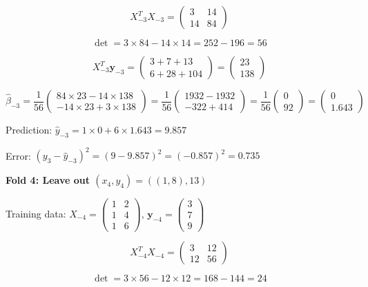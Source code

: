 \documentclass[12pt]{article}
\begin{document}
\begin{solution}
\[X_{-3}^TX_{-3} = \begin{pmatrix} 3 & 14 \\ 14 & 84 \end{pmatrix}\]

\[\det = 3 \times 84 - 14 \times 14 = 252 - 196 = 56\]

\[X_{-3}^T\mathbf{y}_{-3} = \begin{pmatrix} 3 + 7 + 13 \\ 6 + 28 + 104 \end{pmatrix} = \begin{pmatrix} 23 \\ 138 \end{pmatrix}\]

\[\hat{\beta}_{-3} = \frac{1}{56}\begin{pmatrix} 84 \times 23 - 14 \times 138 \\ -14 \times 23 + 3 \times 138 \end{pmatrix} = \frac{1}{56}\begin{pmatrix} 1932 - 1932 \\ -322 + 414 \end{pmatrix} = \frac{1}{56}\begin{pmatrix} 0 \\ 92 \end{pmatrix} = \begin{pmatrix} 0 \\ 1.643 \end{pmatrix}\]

Prediction: $\hat{y}_{-3} = 1 \times 0 + 6 \times 1.643 = 9.857$

Error: $(y_3 - \hat{y}_{-3})^2 = (9 - 9.857)^2 = (-0.857)^2 = 0.735$

\textbf{Fold 4: Leave out $(x_4, y_4) = ((1,8), 13)$}

Training data: $X_{-4} = \begin{pmatrix} 1 & 2 \\ 1 & 4 \\ 1 & 6 \end{pmatrix}$, $\mathbf{y}_{-4} = \begin{pmatrix} 3 \\ 7 \\ 9 \end{pmatrix}$

\[X_{-4}^TX_{-4} = \begin{pmatrix} 3 & 12 \\ 12 & 56 \end{pmatrix}\]

\[\det = 3 \times 56 - 12 \times 12 = 168 - 144 = 24\]


\end{solution}
\end{document}
